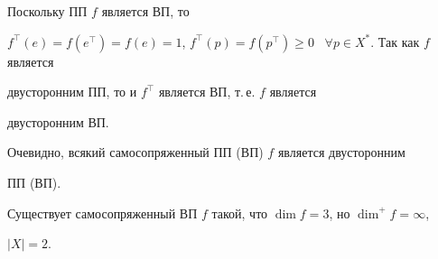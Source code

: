 \begin{pf}


Поскольку ПП $f$ является ВП, то


$f^\top(e)=f(e^\top)=f(e)=1$, $f^\top(p)=f(p^\top)\ge0$ \ $\forall p\in X^*$. Так как $f$ является 


двусторонним ПП, то и $f^\top$ является ВП, т.\,е. $f$ является


двусторонним ВП.


\end{pf}





Очевидно, всякий самосопряженный ПП (ВП) $f$ является двусторонним 


ПП (ВП).





\begin{thm}


Существует самосопряженный ВП $f$ такой, что $\dim f=3$, но $\dim^+f=\infty$,


$|X|=2$.


\end{thm}





